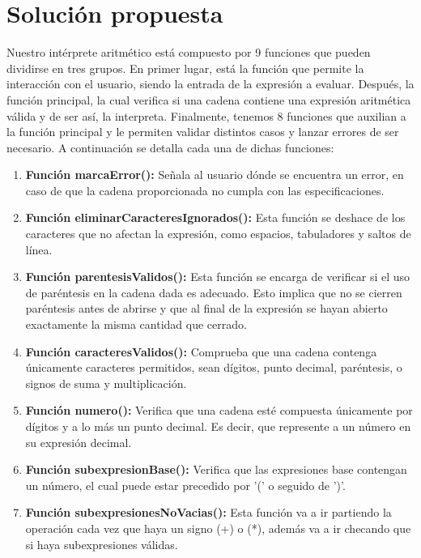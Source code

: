 \documentclass{article}
\begin{document}
\section{Solución propuesta}
\normalsize Nuestro intérprete aritmético está compuesto por 9 funciones que pueden dividirse en tres grupos. En primer lugar, está la función que permite la interacción con el usuario, siendo la entrada de la expresión a evaluar. Después,  la función principal,  la cual  verifica si una cadena contiene una expresión aritmética válida y de ser así, la interpreta. Finalmente, tenemos 8 funciones que auxilian a la función principal y le permiten validar distintos casos y lanzar errores de ser necesario. A continuación se detalla   cada una de dichas funciones:
\begin{enumerate}
    \item \textbf{Función marcaError():} Señala  al usuario  dónde se encuentra un error, en caso de que la cadena proporcionada  no cumpla con las especificaciones.
    
    \item \textbf{Función eliminarCaracteresIgnorados():} Esta función se deshace  de los caracteres que no afectan la expresión, como espacios, tabuladores y saltos de línea. 
    
    \item \textbf{Función parentesisValidos():} Esta función se encarga de verificar si el uso de paréntesis en la cadena dada es adecuado. Esto implica que no se cierren paréntesis antes de abrirse y que al final de la expresión se hayan abierto exactamente la misma cantidad que cerrado.
    
    \item \textbf{Función caracteresValidos():} Comprueba que una cadena contenga únicamente caracteres permitidos, sean dígitos, punto decimal, paréntesis, o signos de suma y multiplicación.
    
    \item \textbf{Función numero():} Verifica que una cadena esté compuesta únicamente por dígitos y a lo más un punto decimal. Es decir, que represente a un número en su expresión decimal.
    
    \item \textbf{Función subexpresionBase():} Verifica que las expresiones base contengan un número, el cual puede estar precedido por '(' o seguido de ')'.
    
    \item \textbf{Función subexpresionesNoVacias():} Esta función va a ir partiendo la operación cada vez que haya un signo (+) o (*), además va a ir checando que si haya subexpresiones válidas.
    

\end{enumerate}
\end{document}
